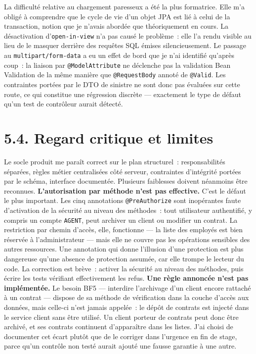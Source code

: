 \documentclass[12pt,a4paper]{report}
\begin{document}
La difficulté relative au chargement paresseux a été la plus formatrice. Elle m'a obligé à comprendre que le cycle de vie d'un objet JPA est lié à celui de la transaction, notion que je n'avais abordée que théoriquement en cours. La désactivation d'\texttt{open-in-view} n'a pas causé le problème~: elle l'a rendu visible au lieu de le masquer derrière des requêtes SQL émises silencieusement.
Le passage au \texttt{multipart/form-data} a eu un effet de bord que je n'ai identifié qu'après coup~: la liaison par \texttt{@ModelAttribute} ne déclenche pas la validation Bean Validation de la même manière que \texttt{@RequestBody} annoté de \texttt{@Valid}. Les contraintes portées par le DTO de sinistre ne sont donc pas évaluées sur cette route, ce qui constitue une régression discrète — exactement le type de défaut qu'un test de contrôleur aurait détecté.
\section*{5.4. Regard critique et limites}
Le socle produit me paraît correct sur le plan structurel~: responsabilités séparées, règles métier centralisées côté serveur, contraintes d'intégrité portées par le schéma, interface documentée. Plusieurs faiblesses doivent néanmoins être reconnues.
\textbf{L'autorisation par méthode n'est pas effective.} C'est le défaut le plus important. Les cinq annotations \texttt{@PreAuthorize} sont inopérantes faute d'activation de la sécurité au niveau des méthodes~: tout utilisateur authentifié, y compris un compte \texttt{AGENT}, peut archiver un client ou modifier un contrat. La restriction par chemin d'accès, elle, fonctionne — la liste des employés est bien réservée à l'administrateur — mais elle ne couvre pas les opérations sensibles des autres ressources. Une annotation qui donne l'illusion d'une protection est plus dangereuse qu'une absence de protection assumée, car elle trompe le lecteur du code. La correction est brève~: activer la sécurité au niveau des méthodes, puis écrire les tests vérifiant effectivement les refus.
\textbf{Une règle annoncée n'est pas implémentée.} Le besoin BF5 — interdire l'archivage d'un client encore rattaché à un contrat — dispose de sa méthode de vérification dans la couche d'accès aux données, mais celle-ci n'est jamais appelée~: le dépôt de contrats est injecté dans le service client sans être utilisé. Un client porteur de contrats peut donc être archivé, et ses contrats continuent d'apparaître dans les listes. J'ai choisi de documenter cet écart plutôt que de le corriger dans l'urgence en fin de stage, parce qu'un contrôle non testé aurait ajouté une fausse garantie à une autre.
\end{document}
